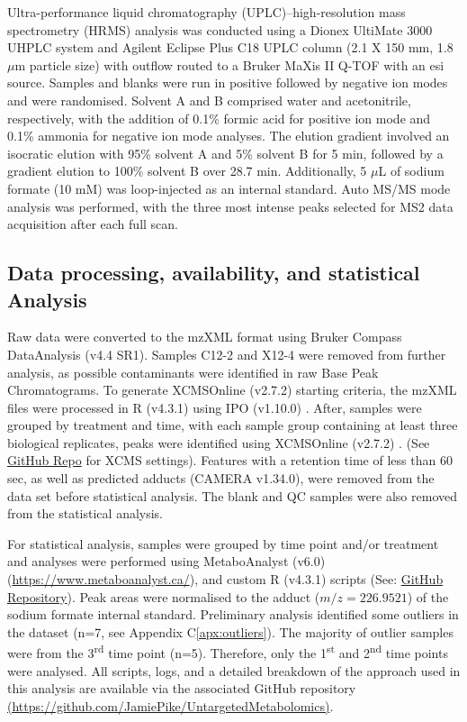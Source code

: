 Ultra-performance liquid chromatography (UPLC)–high-resolution mass spectrometry (HRMS) analysis was conducted using a Dionex UltiMate 3000 UHPLC system and Agilent Eclipse Plus C18 UPLC column (2.1 X 150 mm, 1.8 \(\mu\)m particle size) with outflow routed to a Bruker MaXis II Q-TOF with an \ac{esi} source. Samples and blanks were run in positive followed by negative ion modes and were randomised. Solvent A and B comprised water and acetonitrile, respectively, with the addition of 0.1\% formic acid for positive ion mode and 0.1\% ammonia for negative ion mode analyses. The elution gradient involved an isocratic elution with 95\% solvent A and 5\% solvent B for 5 min, followed by a gradient elution to 100\% solvent B over 28.7 min. Additionally, 5 \(\mu\)L of sodium formate (10 mM) was loop-injected as an internal standard. Auto MS/MS mode analysis was performed, with the three most intense peaks selected for MS2 data acquisition after each full scan.

\subsection{Data processing, availability, and statistical Analysis}
\label{sec:XCMS}
Raw data were converted to the mzXML format using Bruker Compass DataAnalysis (v4.4 SR1). Samples C12-2 and X12-4 were removed from further analysis, as possible contaminants were identified in raw Base Peak Chromatograms. To generate XCMSOnline (v2.7.2) \parencite{Gowda2014} starting criteria, the mzXML files were processed in R (v4.3.1) \parencite{R} using IPO (v1.10.0) \parencite{Libiseller2015}. After, samples were grouped by treatment and time, with each sample group containing at least three biological replicates, peaks were identified using XCMSOnline (v2.7.2) \parencite{Gowda2014}. (See \href{https://github.com/JamiePike/UntargetedMetabolomics/tree/main/NovDec22/XCMS}{GitHub Repo} for XCMS settings). Features with a retention time of less than 60 sec, as well as predicted adducts (CAMERA v1.34.0), were removed from the data set before statistical analysis. The blank and QC samples were also removed from the statistical analysis.

For statistical analysis, samples were grouped by time point and/or treatment and analyses were performed using MetaboAnalyst (v6.0) (\href{https://www.metaboanalyst.ca/}{https://www.metaboanalyst.ca/}), and custom R (v4.3.1) \parencite{R} scripts (See: \href{https://github.com/JamiePike/UntargetedMetabolomics/tree/main}{GitHub Repository}). Peak areas were normalised to the   adduct ($m/z=226.9521$) of the sodium formate internal standard.  Preliminary analysis identified some outliers in the dataset (n=7, see Appendix C\ref{apx:outliers}). The majority of outlier samples were from the 3\textsuperscript{rd} time point (n=5). Therefore, only the 1\textsuperscript{st} and 2\textsuperscript{nd} time points were analysed. All scripts, logs, and a detailed breakdown of the approach used in this analysis are available via the associated GitHub repository \href{https://github.com/JamiePike/UntargetedMetabolomics}{ (https://github.com/JamiePike/UntargetedMetabolomics)}. 

